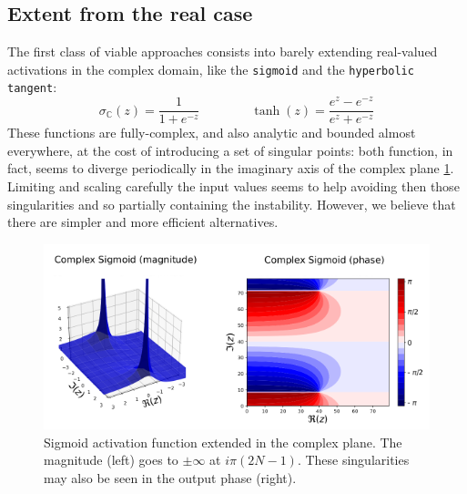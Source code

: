 \documentclass[../main.tex]{subfiles}
\begin{document}
\subsection*{Extent from the real case}
The first class of viable approaches consists into barely extending real-valued activations in the complex domain, like the \texttt{sigmoid} and the \texttt{hyperbolic tangent}:
\[ \sigma_\mathds{C}(z) = \frac{1}{1+e^{-z}}  \qquad\qquad \tanh(z) = \frac{e^z - e^{-z}}{e^z + e^{-z}} \]
These functions are fully-complex, and also analytic and bounded almost everywhere, at the cost of introducing a set of singular points: both function, in fact, seems to diverge periodically in the imaginary axis of the complex plane \ref{fig:cmplx_sigmoid}. Limiting and scaling carefully the input values seems to help avoiding then those singularities and so partially containing the instability. However, we believe that there are simpler and more efficient alternatives.
\begin{figure}[!ht]
	\centering
	\includegraphics[width=\textwidth]{pictures/cmplx_sigmoid}
	\caption{Sigmoid activation function extended in the complex plane. The magnitude (left) goes to $\pm\infty$ at $i\pi(2N-1)$. These singularities may also be seen in the output phase (right).}
	\label{fig:cmplx_sigmoid}
\end{figure}
\end{document}
